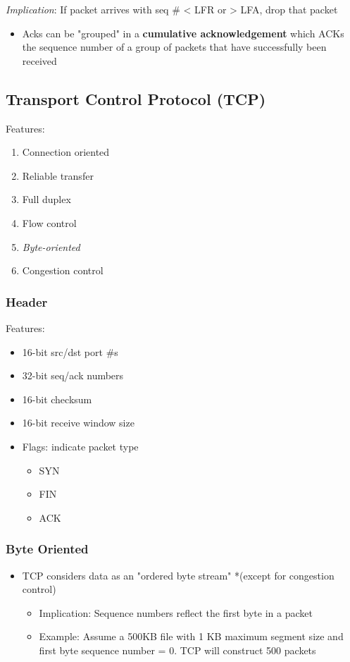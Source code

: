 \documentclass[11pt]{article}
\begin{document}
\emph{Implication}: If packet arrives with seq \# < LFR or > LFA, drop that
packet
\begin{itemize}
\item Acks can be "grouped" in a \textbf{cumulative acknowledgement} which ACKs
the sequence number of a group of packets that have successfully
been received
\end{itemize}

\subsection{Transport Control Protocol (TCP)}
\label{sec:orgheadline133}
Features:
\begin{enumerate}
\item Connection oriented
\item Reliable transfer
\item Full duplex
\item Flow control
\item \emph{Byte-oriented}
\item Congestion control
\end{enumerate}

\subsubsection{Header}
\label{sec:orgheadline130}
Features:
\begin{itemize}
\item 16-bit src/dst port \#s
\item 32-bit seq/ack numbers
\item 16-bit checksum
\item 16-bit receive window size
\item Flags: indicate packet type
\begin{itemize}
\item SYN
\item FIN
\item ACK
\end{itemize}
\end{itemize}

\subsubsection{Byte Oriented}
\label{sec:orgheadline131}
\begin{itemize}
\item TCP considers data as an "ordered byte stream" *(except for
congestion control)
\begin{itemize}
\item Implication: Sequence numbers reflect the first byte in a packet
\item Example: Assume a 500KB file with 1 KB maximum segment size and
first byte sequence number = 0. TCP will construct 500 packets
\end{itemize}
\end{itemize}
\end{document}
